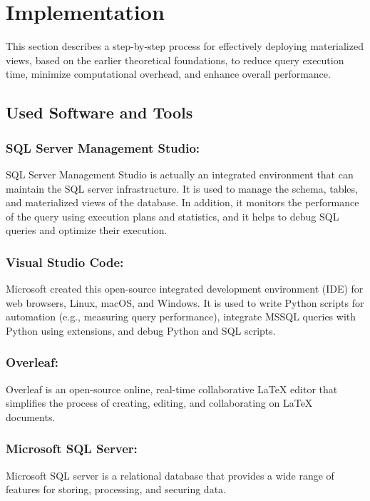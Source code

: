 \section{Implementation}
This section describes a step-by-step process for effectively deploying materialized views, based on the earlier theoretical foundations, to reduce query execution time, minimize computational overhead, and enhance overall performance.

\subsection{Used Software and Tools}
\subsubsection{SQL Server Management Studio:}SQL Server Management Studio is actually an integrated environment that can maintain the SQL server infrastructure. It is used to manage the schema, tables, and materialized views of the database. In addition, it monitors the performance of the query using execution plans and statistics, and it helps to debug SQL queries and optimize their execution.

\subsubsection{Visual Studio Code:} Microsoft created this open-source integrated development environment (IDE) for web browsers, Linux, macOS, and Windows. It is used to write Python scripts for automation (e.g., measuring query performance), integrate MSSQL queries with Python using extensions, and debug Python and SQL scripts.

\subsubsection{Overleaf:} Overleaf is an open-source online, real-time collaborative LaTeX editor that simplifies the process of creating, editing, and collaborating on LaTeX documents.

\subsubsection{Microsoft SQL Server:} Microsoft SQL server is a relational database that provides a wide range of features for storing, processing, and securing data.


